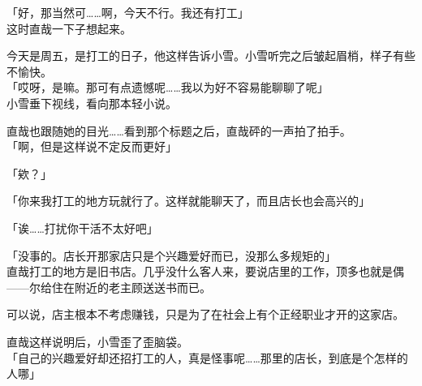 「好，那当然可……啊，今天不行。我还有打工」\\

这时直哉一下子想起来。

今天是周五，是打工的日子，他这样告诉小雪。小雪听完之后皱起眉梢，样子有些不愉快。\\

「哎呀，是嘛。那可有点遗憾呢……我以为好不容易能聊聊了呢」\\

小雪垂下视线，看向那本轻小说。

直哉也跟随她的目光……看到那个标题之后，直哉砰的一声拍了拍手。\\

「啊，但是这样说不定反而更好」

「欸？」

「你来我打工的地方玩就行了。这样就能聊天了，而且店长也会高兴的」

「诶……打扰你干活不太好吧」

「没事的。店长开那家店只是个兴趣爱好而已，没那么多规矩的」\\

直哉打工的地方是旧书店。几乎没什么客人来，要说店里的工作，顶多也就是偶——尔给住在附近的老主顾送送书而已。

可以说，店主根本不考虑赚钱，只是为了在社会上有个正经职业才开的这家店。

直哉这样说明后，小雪歪了歪脑袋。\\

「自己的兴趣爱好却还招打工的人，真是怪事呢……那里的店长，到底是个怎样的人哪」

